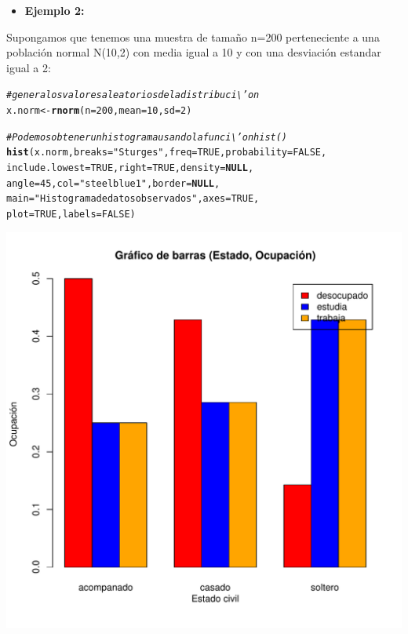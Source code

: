 \documentclass[12pt,letterpaper]{article}\usepackage[]{graphicx}\usepackage[]{color}
\makeatletter
\def\maxwidth{ %
  \ifdim\Gin@nat@width>\linewidth
    \linewidth
  \else
    \Gin@nat@width
  \fi
}
\newcommand{\hlnum}[1]{\textcolor[rgb]{0.686,0.059,0.569}{#1}}%
\newcommand{\hlstr}[1]{\textcolor[rgb]{0.192,0.494,0.8}{#1}}%
\newcommand{\hlcom}[1]{\textcolor[rgb]{0.678,0.584,0.686}{\textit{#1}}}%
\newcommand{\hlstd}[1]{\textcolor[rgb]{0.345,0.345,0.345}{#1}}%
\newcommand{\hlkwa}[1]{\textcolor[rgb]{0.161,0.373,0.58}{\textbf{#1}}}%
\newcommand{\hlkwb}[1]{\textcolor[rgb]{0.69,0.353,0.396}{#1}}%
\newcommand{\hlkwc}[1]{\textcolor[rgb]{0.333,0.667,0.333}{#1}}%
\newcommand{\hlkwd}[1]{\textcolor[rgb]{0.737,0.353,0.396}{\textbf{#1}}}%
\newenvironment{kframe}{%
 \def\at@end@of@kframe{}%
 \ifinner\ifhmode%
  \def\at@end@of@kframe{\end{minipage}}%
  \begin{minipage}{\columnwidth}%
 \fi\fi%
 \def\FrameCommand##1{\hskip\@totalleftmargin \hskip-\fboxsep
 \colorbox{shadecolor}{##1}\hskip-\fboxsep
     \hskip-\linewidth \hskip-\@totalleftmargin \hskip\columnwidth}%
 \MakeFramed {\advance\hsize-\width
   \@totalleftmargin\z@ \linewidth\hsize
   \@setminipage}}%
 {\par\unskip\endMakeFramed%
 \at@end@of@kframe}
\newenvironment{knitrout}{}{} %
\makeatother
\begin{document}
\begin{itemize}
  \item \textbf{Ejemplo 2:}
\end{itemize}
Supongamos que tenemos una muestra de tama\~no n=200 perteneciente a una poblaci\'on normal N(10,2) con media igual a 10 y con una desviaci\'on estandar igual a 2:
\begin{knitrout}
\color{fgcolor}\begin{kframe}
\begin{alltt}
\hlcom{# genera los valores aleatorios de la distribuci\textbackslash{}'on }
\hlstd{x.norm} \hlkwb{<-} \hlkwd{rnorm}\hlstd{(}\hlkwc{n}\hlstd{=}\hlnum{200}\hlstd{,}\hlkwc{mean}\hlstd{=}\hlnum{10}\hlstd{,} \hlkwc{sd}\hlstd{=}\hlnum{2}\hlstd{)}

\hlcom{# Podemos obtener un histograma usando la funci\textbackslash{}'on hist() }
\hlkwd{hist}\hlstd{(x.norm,} \hlkwc{breaks} \hlstd{=} \hlstr{"Sturges"}\hlstd{,} \hlkwc{freq} \hlstd{=} \hlnum{TRUE}\hlstd{,} \hlkwc{probability} \hlstd{=} \hlnum{FALSE}\hlstd{,}
     \hlkwc{include.lowest} \hlstd{=} \hlnum{TRUE}\hlstd{,} \hlkwc{right} \hlstd{=} \hlnum{TRUE}\hlstd{,} \hlkwc{density} \hlstd{=} \hlkwa{NULL}\hlstd{,}
\hlkwc{angle} \hlstd{=} \hlnum{45}\hlstd{,} \hlkwc{col} \hlstd{=} \hlstr{"steelblue1"}\hlstd{,} \hlkwc{border} \hlstd{=} \hlkwa{NULL}\hlstd{,}
\hlkwc{main} \hlstd{=} \hlstr{"Histograma de datos observados"}\hlstd{,} \hlkwc{axes} \hlstd{=} \hlnum{TRUE}\hlstd{,}
\hlkwc{plot} \hlstd{=} \hlnum{TRUE}\hlstd{,} \hlkwc{labels} \hlstd{=} \hlnum{FALSE}\hlstd{)}
\end{alltt}
\end{kframe}
\includegraphics[width=\maxwidth]{figure/unnamed-chunk-16-1} 

\end{knitrout}
\end{document}
